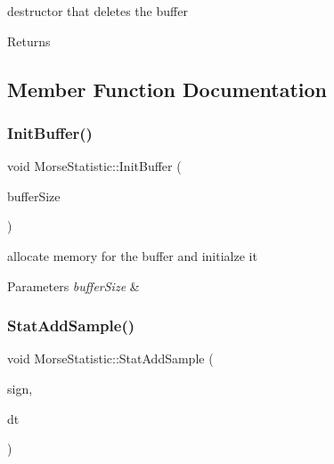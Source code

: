 destructor that deletes the buffer 

\begin{DoxyReturn}{Returns}

\end{DoxyReturn}


\subsection{Member Function Documentation}
\mbox{\label{classMorseStatistic_adc79128f3c472bef513ce8546c833834}} 
\subsubsection{\texorpdfstring{Init\+Buffer()}{InitBuffer()}}
{\footnotesize\ttfamily void Morse\+Statistic\+::\+Init\+Buffer (\begin{DoxyParamCaption}\item[{int}]{buffer\+Size }\end{DoxyParamCaption})\hspace{0.3cm}{\ttfamily [private]}}



allocate memory for the buffer and initialze it 


\begin{DoxyParams}{Parameters}
{\em buffer\+Size} & \\
\hline
\end{DoxyParams}
\mbox{\label{classMorseStatistic_afc0c1198ba34c154ce613591861a339b}} 
\subsubsection{\texorpdfstring{Stat\+Add\+Sample()}{StatAddSample()}}
{\footnotesize\ttfamily void Morse\+Statistic\+::\+Stat\+Add\+Sample (\begin{DoxyParamCaption}\item[{Morse\+::\+Morse\+Sign}]{sign,  }\item[{double}]{dt }\end{DoxyParamCaption})\hspace{0.3cm}{\ttfamily [protected]}}



